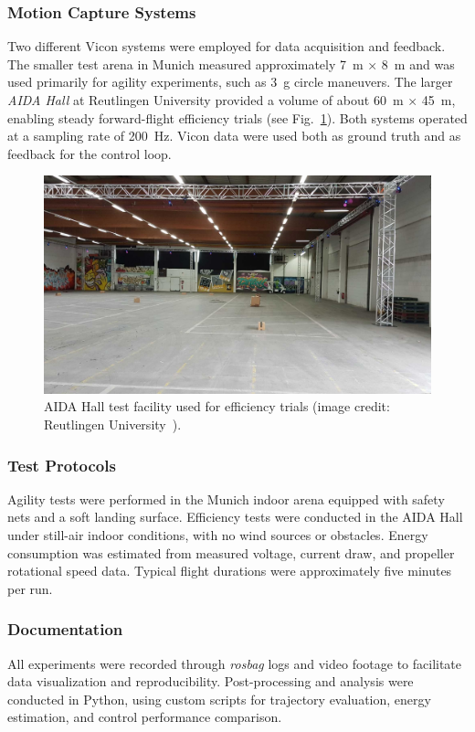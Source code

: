 \subsubsection{Motion Capture Systems}
Two different Vicon systems were employed for data acquisition and feedback.  
The smaller test arena in Munich measured approximately \SI{7}{\meter} × \SI{8}{\meter} and was used primarily for agility experiments, such as \SI{3}{g} circle maneuvers.  
The larger \textit{AIDA Hall} at Reutlingen University provided a volume of about \SI{60}{\meter} × \SI{45}{\meter}, enabling steady forward-flight efficiency trials (see Fig.~\ref{fig:aida_hall}).  
Both systems operated at a sampling rate of \SI{200}{\hertz}.  
Vicon data were used both as ground truth and as feedback for the control loop.

\begin{figure}[h]
\centering
\includegraphics[width=0.85\linewidth]{figures/aida_hall.jpg}
\caption{AIDA Hall test facility used for efficiency trials (image credit: Reutlingen University~\cite{AIDAHallPhoto2024}).}
\label{fig:aida_hall}
\end{figure}

\subsubsection{Test Protocols}
Agility tests were performed in the Munich indoor arena equipped with safety nets and a soft landing surface.  
Efficiency tests were conducted in the AIDA Hall under still-air indoor conditions, with no wind sources or obstacles.  
Energy consumption was estimated from measured voltage, current draw, and propeller rotational speed data.  
Typical flight durations were approximately five minutes per run.

\subsubsection{Documentation}
All experiments were recorded through \textit{rosbag} logs and video footage to facilitate data visualization and reproducibility.  
Post-processing and analysis were conducted in Python, using custom scripts for trajectory evaluation, energy estimation, and control performance comparison.
